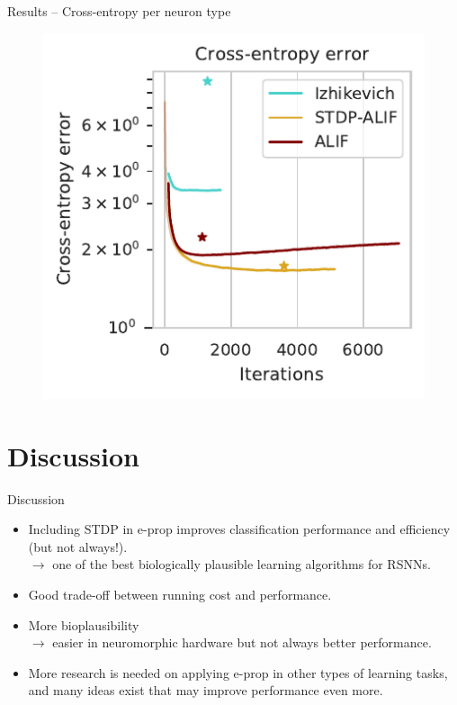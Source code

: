 \documentclass[t]{beamer}
\begin{document}
\begin{frame}{Results -- Cross-entropy per neuron type}
  \begin{figure}[!ht]
    \centering
    \includegraphics[width=0.6\linewidth]{crossentropy}
  \end{figure}
\end{frame}




\section{Discussion}
\begin{frame}{Discussion}
  \begin{itemize}[label=--]
    \item Including STDP in e-prop improves classification performance and efficiency (but not always!).\\
    $\rightarrow$ one of the best biologically plausible learning algorithms for RSNNs.
    \item Good trade-off between running cost and performance.
    \item More bioplausibility \\$\rightarrow$ easier in neuromorphic hardware but not always better performance.
    \item More research is needed on applying e-prop in other types of learning tasks, and many ideas exist that may improve performance even more.
    \end{itemize}
\end{frame}
\end{document}
